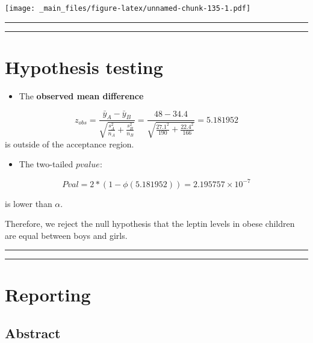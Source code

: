 \documentclass[
]{book}
\providecommand{\tightlist}{%
  \setlength{\itemsep}{0pt}\setlength{\parskip}{0pt}}
\begin{document}
\texttt{[image: \_main\_files/figure-latex/unnamed-chunk-135-1.pdf]}

\begin{center}\rule{0.5\linewidth}{0.5pt}\end{center}

\begin{center}\rule{0.5\linewidth}{0.5pt}\end{center}

\hypertarget{hypothesis-testing-1}{%
\section{Hypothesis testing}\label{hypothesis-testing-1}}

\begin{itemize}
\tightlist
\item
  The \textbf{observed mean difference}
\end{itemize}

\[z_{obs}=\frac{\bar{y}_A-\bar{y}_B }{\sqrt{\frac{s^2_A}{n_A}+\frac{s^2_B}{n_B}}}=\frac{48-34.4}{\sqrt{\frac{27.1^2}{190}+\frac{22.4^2}{166}}}=5.181952\]
is outside of the acceptance region.

\begin{itemize}
\tightlist
\item
  The two-tailed \(pvalue\):
\end{itemize}

\[Pval=2*(1-\phi(5.181952))=2.195757 \times 10^{-7}\]

is lower than \(\alpha\).

Therefore, we reject the null hypothesis that the leptin levels in obese children are equal between boys and girls.

\begin{center}\rule{0.5\linewidth}{0.5pt}\end{center}

\begin{center}\rule{0.5\linewidth}{0.5pt}\end{center}

\hypertarget{reporting}{%
\section{Reporting}\label{reporting}}

\hypertarget{abstract}{%
\subsection{Abstract}\label{abstract}}
\end{document}
